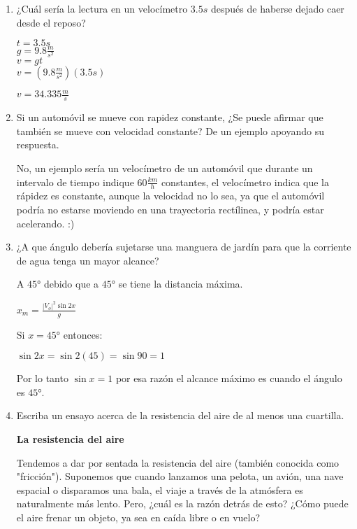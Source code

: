 \documentclass[10pt, a4paper]{article}
\begin{document}
    \begin{enumerate}
        \item ¿Cuál sería la lectura en un velocímetro $3.5 \si{s}$ después de haberse dejado caer
        desde el reposo?

        \begin{center}
            $t= 3.5 \si{s}$\\
            $g= 9.8 \si{\frac{m}{s^2}}$\\
            $v= gt$\\
            $v= (9.8\si{\frac{m}{s^2}})(3.5\si{s})$

            $v= 34.335 \si{\frac{m}{s}}$
        \end{center}

        \item Si un automóvil se mueve con rapidez constante, ¿Se puede afirmar que también
        se mueve con velocidad constante? De un ejemplo apoyando su respuesta.

        No, un ejemplo sería un velocímetro de un automóvil que durante un intervalo de tiempo indique
        $60 \si{\frac{km}{h}}$ constantes, el velocímetro indica que la rápidez es constante, aunque la velocidad 
        no lo sea, ya que el automóvil podría no estarse moviendo en una trayectoria rectílinea, y podría 
        estar acelerando. :)

        \item ¿A que ángulo debería sujetarse una manguera de jardín para que la corriente
        de agua tenga un mayor alcance?

        \begin{center}
            A $\ang{45}$ debido que a $\ang{45}$ se tiene la distancia máxima.

            $x_m=\frac{|V_o|^2\sin{2x}}{g}$

            Si $x= \ang{45}$ entonces:

            $\sin{2x}=\sin{2(45)}=\sin{90}=1$
            
            Por lo tanto $\sin x = 1$ por esa razón el alcance máximo es cuando el ángulo es $\ang{45}$.
        \end{center}

        \item Escriba un ensayo acerca de la resistencia del aire de al menos una cuartilla.
        \begin{center}
            \textbf{La resistencia del aire}
        \end{center}
        Tendemos a dar por sentada la resistencia del aire (también conocida como "fricción").
        Suponemos que cuando lanzamos una pelota, un avión, una nave espacial o disparamos una
        bala, el viaje a través de la atmósfera es naturalmente más lento. Pero, ¿cuál es la razón detrás de
        esto? ¿Cómo puede el aire frenar un objeto, ya sea en caída libre o en vuelo?


\end{enumerate}
\end{document}
